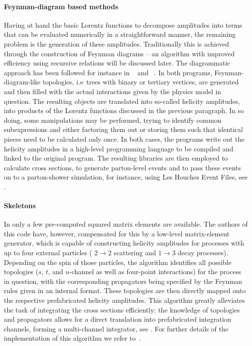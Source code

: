  
\paragraph{Feynman-diagram based methods}

Having at hand the basic Lorentz functions to decompose amplitudes into terms that can
be evaluated numerically in a straightforward manner, the remaining problem is
the generation of these amplitudes.  Traditionally this is achieved through
the construction of Feynman diagrams -- an algorithm with improved efficiency using 
recursive relations will be discussed later.  The diagrammatic approach has been followed 
for instance in \Madgraph~\cite{Stelzer:1994ta} and \Amegic~\cite{Krauss:2001iv}.  
In both programs, Feynman-diagram-like topologies, i.e\ trees with binary or tertiary 
vertices, are generated and then filled with the actual interactions given by the physics
model in question.  The resulting objects are translated into so-called helicity amplitudes,
\ie into products of the Lorentz functions discussed in the previous
paragraph.  In so doing, some manipulations may be performed, trying to
identify common subexpressions and either factoring them out or storing them 
such that identical pieces need to be calculated only once.
In both cases, the programs write out the helicity amplitudes in a high-level
programming language to be compiled and linked to the original program. The resulting
libraries are then employed to calculate cross sections, to generate parton-level events
and to pass these events on to a parton-shower simulation, for instance, using Les Houches 
Event Files, see .

 
\paragraph{Skeletons}

In \Herwigpp only a few pre-computed squared matrix elements are 
available.  The authors of this code have, however, compensated for this by 
a low-level matrix-element generator, which is capable of constructing
helicity amplitudes for processes with up to four external particles (\ie
$2\to2$ scattering and $1\to3$ decay processes).  Depending on the spin 
of those particles, the algorithm identifies all possible topologies
($s$, $t$, and $u$-channel as well as four-point interactions) for the 
process in question, with the corresponding propagators being specified by
the Feynman rules given in an internal format.  These topologies are then
directly mapped onto the respective prefabricated helicity amplitudes.
This algorithm greatly alleviates the task of integrating the cross sections 
efficiently: the knowledge of topologies and propagators allows for a direct 
translation into prefabricated integration channels, forming a multi-channel
integrator, see . For further details of the 
implementation of this algorithm we refer to~\cite{Gigg:2007cr}.

